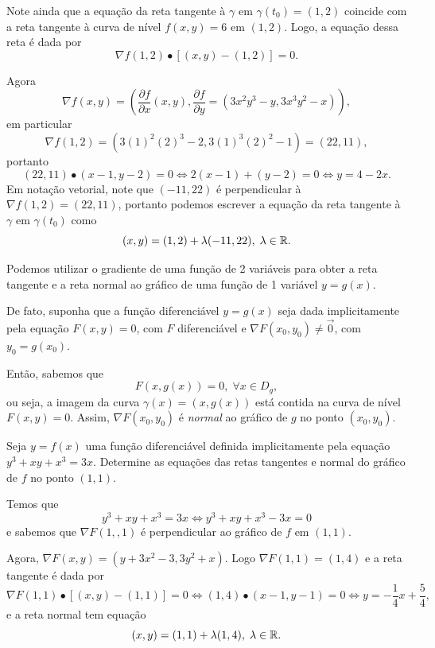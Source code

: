 \begin{example}
    Note ainda que a equação da reta tangente à \(\gamma\) em \(\gamma(t_0) = (1,2)\) coincide com a reta tangente à curva de nível \(f(x,y) = 6\) em \((1,2)\). Logo, a equação dessa reta é dada por \[\nabla f(1,2) \bullet [(x,y) - (1,2)] = 0.\]

    Agora \[\nabla f(x,y) = \left( \frac{\partial f}{\partial x}(x,y), \frac{\partial f}{\partial y} = (3x^2y^3 - y, 3x^3y^2 - x) \right),\] em particular \[\nabla f(1,2) = (3(1)^2(2)^3 - 2, 3(1)^3(2)^2 - 1) = (22,11),\] portanto \[(22,11)\bullet(x-1,y-2) = 0 \Leftrightarrow 2(x-1) + (y-2) = 0 \Leftrightarrow y = 4-2x.\] Em notação vetorial, note que \((-11,22)\) é perpendicular à \(\nabla f(1,2) = (22,11)\), portanto podemos escrever a equação da reta tangente à \(\gamma\) em \(\gamma(t_0)\) como \[(x,y) = (1,2) + \lambda(-11,22),\; \lambda\in\mathbb{R}.\]
\end{example}

\begin{remark}
    Podemos utilizar o gradiente de uma função de 2 variáveis para obter a reta tangente e a reta normal ao gráfico de uma função de 1 variável \(y = g(x)\).

    De fato, suponha que a função diferenciável \(y = g(x)\) seja dada implicitamente pela equação \(F(x,y) = 0\), com \(F\) diferenciável e \(\nabla F(x_0,y_0) \neq \overrightarrow{0}\), com \(y_0 = g(x_0)\).

    Então, sabemos que \[F(x,g(x)) = 0,\; \forall x\in D_g,\] ou seja, a imagem da curva \(\gamma(x) = (x,g(x))\) está contida na curva de nível \(F(x,y) = 0.\) Assim, \(\nabla F(x_0,y_0)\) é \textit{normal} ao gráfico de \(g\) no ponto \((x_0,y_0)\).
\end{remark}

\begin{example}
    Seja \(y = f(x)\) uma função diferenciável definida implicitamente pela equação \(y^3 + xy + x^3 = 3x\). Determine as equações das retas tangentes e normal do gráfico de \(f\) no ponto \((1,1)\).

    Temos que \[y^3 + xy + x^3 = 3x \Leftrightarrow y^3 + xy + x^3 - 3x = 0\] e sabemos que \(\nabla F(1,,1)\) é perpendicular ao gráfico de \(f\) em \((1,1)\).

    Agora, \(\nabla F(x,y) = (y + 3x^2 - 3, 3y^2 + x)\). Logo \(\nabla F(1,1) = (1,4)\) e a reta tangente é dada por \[\nabla F(1,1)\bullet[(x,y) - (1,1)] = 0 \Leftrightarrow (1,4)\bullet(x-1,y-1) = 0 \Leftrightarrow y = -\frac{1}{4}x + \frac{5}{4},\] e a reta normal tem equação \[(x,y) = (1,1) + \lambda(1,4),\; \lambda\in\mathbb{R}.\]
\end{example}

